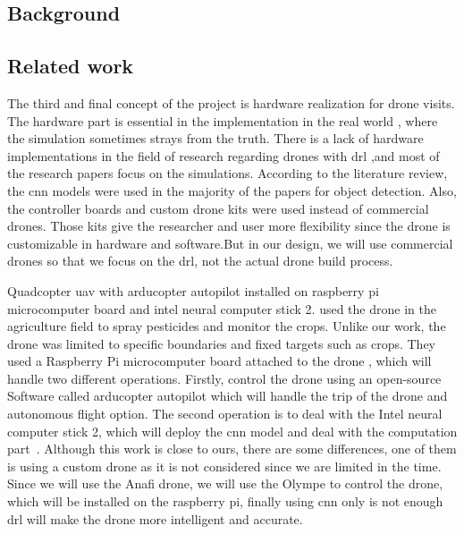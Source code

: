 \documentclass[../main.tex]{subfiles}
\begin{document}
\subsection{Background}

\blindtext

\subsection{Related work}


		The third and final concept of the project is hardware realization for drone visits.
		The hardware part is essential in the implementation in the real world
		, where the simulation sometimes strays from the truth.
		There is a lack of hardware implementations in the field of research regarding drones with \gls{drl}
		 ,and most of the research papers focus on the simulations.
		According to the literature review, 
		the \gls{cnn} models were used in the majority of the papers for object detection. 
		Also, the controller boards and custom drone kits were used instead of commercial drones.
		Those kits give the researcher and user more flexibility since the drone is customizable 
		in hardware and software.But in our design, we will use commercial drones so that we focus
		 on the \gls{drl}, not the actual drone build process. 


	Quadcopter \gls{uav} with arducopter autopilot installed on raspberry pi
	 microcomputer board and intel neural computer stick 2.
	\citeauthor{Khan21} used the drone in the agriculture field to spray 
	pesticides and monitor the crops. Unlike our work, the drone was limited to specific
	boundaries and fixed targets such as crops.
	They used a Raspberry Pi microcomputer board attached to the drone
	, which will handle two different operations. Firstly, control the drone using an open-source
	 Software called arducopter autopilot which will handle the trip of the drone and autonomous 
	 flight option. The second operation is to deal with the Intel neural computer stick 2, 
	 which will deploy the \gls{cnn} model and deal with the computation part~\cite{Khan21}.
	Although this work is close to ours, there are some differences, 
	one of them is using a custom drone as it is not considered since we are limited in the time.
	Since we will use the Anafi drone, we will use the Olympe to control the drone, which will
	 be installed on the raspberry pi, finally using \gls{cnn} only is not enough \gls{drl} 
	 will make the drone more intelligent and accurate.
\end{document}
